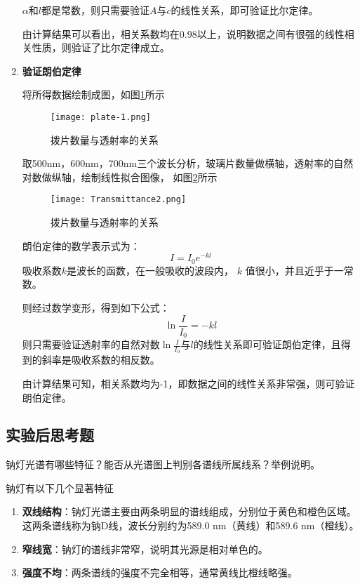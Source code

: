 \documentclass[dvipsnames, svgnames,a4paper,11pt]{article}
\begin{document}
\begin{enumerate}
				$\alpha$和$l$都是常数，则只需要验证$A$与$c$的线性关系，即可验证比尔定律。
				
				由计算结果可以看出，相关系数均在0.98以上，说明数据之间有很强的线性相关性质，则验证了比尔定律成立。
				
				
				
			\item \textbf{验证朗伯定律}
				
				将所得数据绘制成图，如图\ref{fig:plate-1}所示
		
				\begin{figure}[htbp]
					\centering
					\texttt{[image: plate-1.png]}
					\caption{拨片数量与透射率的关系}
					\label{fig:plate-1}
				\end{figure}
			
				取500nm，600nm，700nm三个波长分析，玻璃片数量做横轴，透射率的自然对数做纵轴，绘制线性拟合图像， 如图\ref{fig:Transmittance2}所示
				
				\begin{figure}[htbp]
					\centering
					\texttt{[image: Transmittance2.png]}
					\caption{拨片数量与透射率的关系}
					\label{fig:Transmittance2}
				\end{figure}
				
				朗伯定律的数学表示式为：
				\[ I = I_0 e^{-kl} \]
				吸收系数$k$是波长的函数，在一般吸收的波段内， $k$ 值很小，并且近乎于一常数。
				
				则经过数学变形，得到如下公式：
				\[ \ln \frac{I}{I_0}=-kl \]
				则只需要验证透射率的自然对数$\ln \frac{I}{I_0}$与$l$的线性关系即可验证朗伯定律，且得到的斜率是吸收系数的相反数。
				
				由计算结果可知，相关系数均为-1，即数据之间的线性关系非常强，则可验证朗伯定律。
	
		\end{enumerate}
			
		
		
\subsection{实验后思考题}



\begin{question}
	 钠灯光谱有哪些特征？能否从光谱图上判别各谱线所属线系？举例说明。
\end{question}
	
	钠灯有以下几个显著特征
	\begin{enumerate}
		\item \textbf{双线结构}：钠灯光谱主要由两条明显的谱线组成，分别位于黄色和橙色区域。这两条谱线称为钠D线，波长分别约为589.0 nm（黄线）和589.6 nm（橙线）。
		
		\item \textbf{窄线宽}：钠灯的谱线非常窄，说明其光源是相对单色的。
		
		\item \textbf{强度不均}：两条谱线的强度不完全相等，通常黄线比橙线略强。
	\end{enumerate}
	
\end{document}
